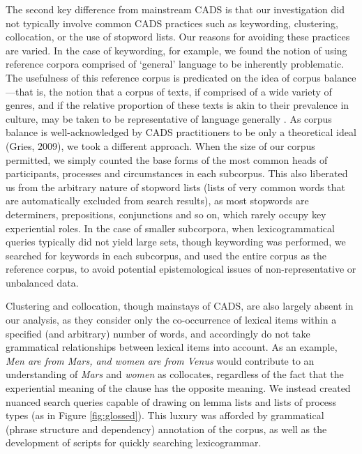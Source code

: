 The second key difference from mainstream CADS is that our investigation did not typically involve common CADS practices such as keywording, clustering, collocation, or the use of stopword lists. Our reasons for avoiding these practices are varied. In the case of keywording, for example, we found the notion of using reference corpora comprised of `general' language to be inherently problematic. The usefulness of this reference corpus is predicated on the idea of corpus balance---that is, the notion that a corpus of texts, if comprised of a wide variety of genres, and if the relative proportion of these texts is akin to their prevalence in culture, may be taken to be representative of language generally \cite{chen_sinica_1996}. As corpus balance is well-acknowledged by CADS practitioners to be only a theoretical ideal (Gries, 2009), we took a different approach. When the size of our corpus permitted, we simply counted the base forms of the most common heads of participants, processes and circumstances in each subcorpus. This also liberated us from the arbitrary nature of stopword lists (lists of very common words that are automatically excluded from search results), as most stopwords are determiners, prepositions, conjunctions and so on, which rarely occupy key experiential roles. In the case of smaller subcorpora, when lexicogrammatical queries typically did not yield large sets, though keywording was performed, we searched for keywords in each subcorpus, and used the entire corpus as the reference corpus, to avoid potential epistemological issues of non-representative or unbalanced data.

Clustering and collocation, though mainstays of CADS, are also largely absent in our analysis, as they consider only the co-occurrence of lexical items within a specified (and arbitrary) number of words, and accordingly do not take grammatical relationships between lexical items into account. As an example, \emph{Men are from Mars, and women are from Venus} would contribute to an understanding of \emph{Mars} and \emph{women} as collocates, regardless of the fact that the experiential meaning of the clause has the opposite meaning. We instead created nuanced search queries capable of drawing on lemma lists and lists of process types (as in Figure \ref{fig:glossed}). This luxury was afforded by grammatical (phrase structure and dependency) annotation of the corpus, as well as the development of scripts for quickly searching lexicogrammar.


